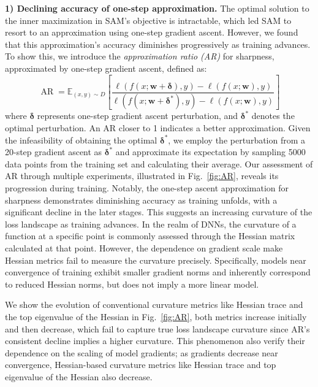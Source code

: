 \documentclass[letterpaper]{article} %
\theoremstyle{plain}
\theoremstyle{definition}
\newcommand{\fref}[1]{Fig.~\ref{#1}}
\begin{document}
\textbf{1) Declining accuracy of one-step approximation.}
The optimal solution to the inner maximization in SAM's objective is intractable, which led SAM to resort to an approximation using one-step gradient ascent. However, we found that this approximation's accuracy diminishes progressively as training advances. To show this, we introduce the \emph{approximation ratio (AR)} for sharpness, approximated by one-step gradient ascent, defined as:
\begin{equation}
\operatorname{AR} = \mathbb{E}_{(x, y) \sim D}\left[\frac{\ell\left(f\left(x; \boldsymbol{w+\delta}\right), y\right)-\ell\left(f\left(x ; \boldsymbol{w}\right), y\right)}{\ell\left(f\left(x; \boldsymbol{w+\delta^*}\right), y\right)-\ell\left(f\left(x ; \boldsymbol{w}\right), y\right)}\right]
\end{equation}
where $\boldsymbol{\delta}$ represents one-step gradient ascent perturbation, and $\boldsymbol{\delta^*}$ denotes the optimal perturbation. An AR closer to 1 indicates a better approximation. Given the infeasibility of obtaining the optimal $\boldsymbol{\delta^*}$, we employ the perturbation from a 20-step gradient ascent as $\boldsymbol{\delta^*}$ and approximate its expectation by sampling 5000 data points from the training set and calculating their average. Our assessment of AR through multiple experiments, illustrated in \fref{fig:AR}, reveals its progression during training. Notably, the one-step ascent approximation for sharpness demonstrates diminishing accuracy as training unfolds, with a significant decline in the later stages. This suggests an increasing curvature of the loss landscape as training advances. In the realm of DNNs, the curvature of a function at a specific point is commonly assessed through the Hessian matrix calculated at that point. However, the dependence on gradient scale make Hessian metrics fail to measure the curvature precisely. Specifically, models near convergence of training exhibit smaller gradient norms and inherently correspond to reduced Hessian norms, but does not imply a more linear model.

We show the evolution of conventional curvature metrics like Hessian trace and the top eigenvalue of the Hessian in \fref{fig:AR}, both metrics increase initially and then decrease, which fail to capture true loss landscape curvature since AR's consistent decline implies a higher curvature. This phenomenon also verify their dependence on the scaling of model gradients; as gradients decrease near convergence, Hessian-based curvature metrics like Hessian trace and top eigenvalue of the Hessian also decrease.
\end{document}
